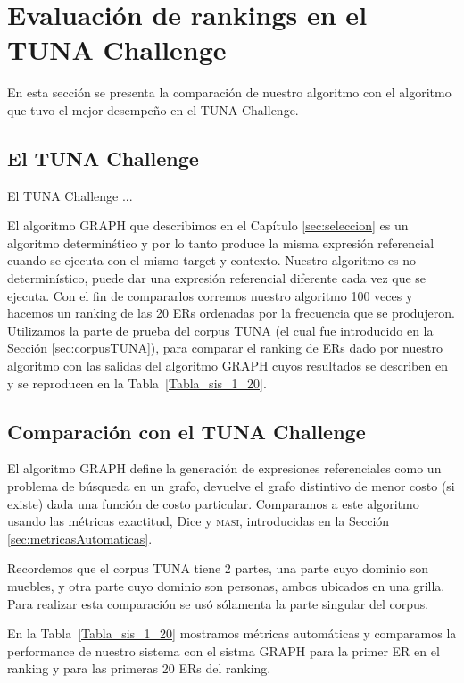 \begin{table}[H]
\section{Evaluaci\'on de rankings en el TUNA Challenge} \label{sec:automaticevaluation}

En esta secci\'on se presenta la comparaci\'on de nuestro algoritmo con el algoritmo que tuvo el mejor desempe\~no en el TUNA Challenge. 

\subsection{El TUNA Challenge}
El TUNA Challenge ...

El algoritmo GRAPH que describimos en el Cap\'itulo \ref{sec:seleccion} es un algoritmo determin\'stico y por lo tanto produce la misma expresi\'on referencial cuando se ejecuta con el mismo target y contexto. Nuestro algoritmo es no-determin\'istico, puede dar una expresi\'on referencial diferente cada vez que se ejecuta. Con el fin de compararlos corremos nuestro algoritmo 100 veces y hacemos un ranking de las 20 ERs ordenadas por la frecuencia que se produjeron. Utilizamos la parte de prueba del corpus TUNA (el cual fue introducido en la Secci\'on \ref{sec:corpusTUNA}), para comparar el ranking de ERs dado por nuestro algoritmo con las salidas del algoritmo GRAPH cuyos resultados se describen en~\cite{KrahmerGRAPH} y se reproducen en la Tabla~\ref{Tabla_sis_1_20}.


\subsection{Comparaci\'on con el TUNA Challenge}
El algoritmo GRAPH define la generaci\'on de expresiones referenciales como un problema de b\'usqueda en un grafo, devuelve el grafo distintivo de menor costo (si existe) dada una funci\'on de costo particular. Comparamos a este algoritmo usando las m\'etricas exactitud, Dice y \textsc {masi}, introducidas en la Secci\'on \ref{sec:metricasAutomaticas}. 

Recordemos que el corpus TUNA tiene 2 partes, una parte cuyo dominio son muebles, y otra parte cuyo dominio son personas, ambos ubicados en una grilla. Para realizar esta comparaci\'on se us\'o s\'olamenta la parte singular del corpus.

En la Tabla~\ref{Tabla_sis_1_20} mostramos m\'etricas autom\'aticas y comparamos la performance de nuestro sistema con el sistma GRAPH para la primer ER en el ranking y para las primeras 20 ERs del ranking.


\end{table}
